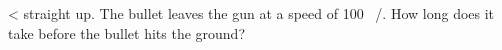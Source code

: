  <%
straight up.  The bullet leaves the gun at a speed of 100
\ \munit/\sunit.  How long does it take before the bullet hits the ground?
